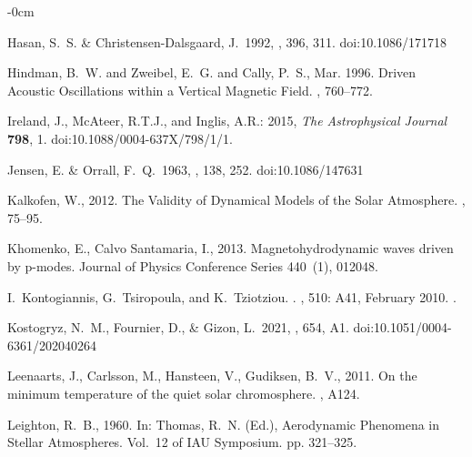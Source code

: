 \documentclass[physics,article,submit,pdftex,moreauthors]{Definitions/mdpi}
\begin{document}
\begin{adjustwidth}{-\extralength}{0cm}
\begin{thebibliography}{999}
 Hasan, S.~S. \& Christensen-Dalsgaard, J.\ 1992, \apj, 396, 311. doi:10.1086/171718



{Hindman}, B.~W. and {Zweibel}, E.~G. and {Cally}, P.~S., Mar. 1996. {Driven Acoustic Oscillations within a Vertical Magnetic Field}. , 760--772.

Ireland, J., McAteer, R.T.J., and Inglis, A.R.: 2015, {\it The Astrophysical Journal} {\bf 798}, 1. doi:10.1088/0004-637X/798/1/1.



 Jensen, E. \& Orrall, F.~Q.\ 1963, \apj, 138, 252. doi:10.1086/147631


{Kalkofen}, W., 2012. {The Validity of Dynamical Models of the Solar
  Atmosphere}. , 75--95.

{Khomenko}, E., {Calvo Santamaria}, I., 2013. {Magnetohydrodynamic waves driven
  by p-modes}. Journal of Physics Conference Series 440~(1), 012048.


I.~{Kontogiannis}, G.~{Tsiropoula}, and K.~{Tziotziou}.
.
\newblock \emph{\aap}, 510: A41, February 2010.
\newblock {}.

 Kostogryz, N.~M., Fournier, D., \& Gizon, L.\ 2021, \aap, 654, A1. doi:10.1051/0004-6361/202040264



{Leenaarts}, J., {Carlsson}, M., {Hansteen}, V., {Gudiksen}, B.~V., 2011. {On
  the minimum temperature of the quiet solar chromosphere}. , A124.


{Leighton}, R.~B., 1960. In: {Thomas}, R.~N. (Ed.), Aerodynamic Phenomena in
  Stellar Atmospheres. Vol.~12 of IAU Symposium. pp. 321--325.


\end{thebibliography}
\end{adjustwidth}
\end{document}
